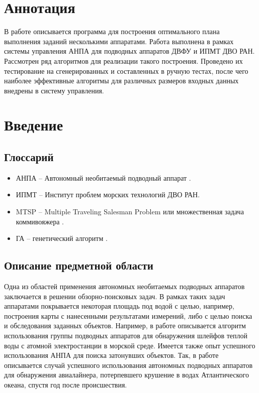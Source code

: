 \documentclass[a4paper,14pt,russian]{article}
\begin{document}
\tableofcontents
\newpage

\section*{Аннотация}

В работе описывается программа для построения оптимального плана выполнения заданий несколькими аппаратами. Работа выполнена в рамках системы управления АНПА для подводных аппаратов ДВФУ и ИПМТ ДВО РАН. Рассмотрен ряд алгоритмов для реализации такого построения. Проведено их тестирование на сгенерированных и составленных в ручную тестах, после чего наиболее эффективные алгоритмы для различных размеров входных данных внедрены в систему управления.

\section{Введение}
\subsection{Глоссарий}
\begin{itemize}
\item АНПА -- Автономный необитаемый подводный аппарат \cite{auv}.
\item ИПМТ -- Институт проблем морских технологий ДВО РАН.
\item MTSP -- Multiple Traveling Salesman Problem или множественная задача коммивояжера \cite{bektas2006multiple}.
\item ГА -- генетический алгоритм \cite{ga}.
\end{itemize}

\subsection{Описание предметной области}

Одна из областей применения автономных необитаемых подводных аппаратов заключается в решении обзорно-поисковых задач. В рамках таких задач аппаратами покрывается некоторая площадь под водой с целью, например, построения карты с нанесенными результатами измерений, либо с целью поиска и обследования заданных объектов.
Например, в работе \cite{cannell2006boundary} описывается алгоритм использования группы подводных аппаратов для обнаружения шлейфов теплой воды с атомной электростанции в морской среде.
Имеется также опыт успешного использования АНПА для поиска затонувших объектов.
Так, в работе \cite{purcell2011use} описывается случай успешного использования автономных подводных аппаратов для обнаружения авиалайнера, потерпевшего крушение в водах Атлантического океана, спустя год после происшествия.
\end{document}
